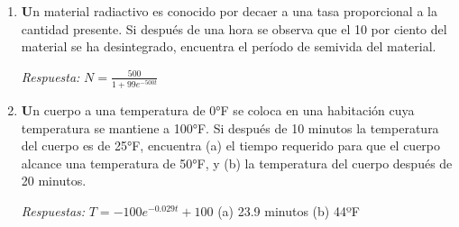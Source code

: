 \documentclass[a4paper,12pt]{article}
\begin{document}
\begin{enumerate}
    \item \textbf Un material radiactivo es conocido por decaer a una tasa proporcional a la cantidad presente. Si después de una hora se observa que el 10 por ciento del material se ha desintegrado, encuentra el período de semivida del material.

\textit{Respuesta:}  
\(N = \frac{500}{1 + 99e^{-500t}}\)
    \item \textbf Un cuerpo a una temperatura de 0°F se coloca en una habitación cuya temperatura se mantiene a 100°F. Si después de 10 minutos la temperatura del cuerpo es de 25°F, encuentra (a) el tiempo requerido para que el cuerpo alcance una temperatura de 50°F, y (b) la temperatura del cuerpo después de 20 minutos.

\textit{Respuestas:}  
\(T = -100e^{-0.029t} + 100\)  
(a) 23.9 minutos
(b) 44ºF


\end{enumerate}
\end{document}
